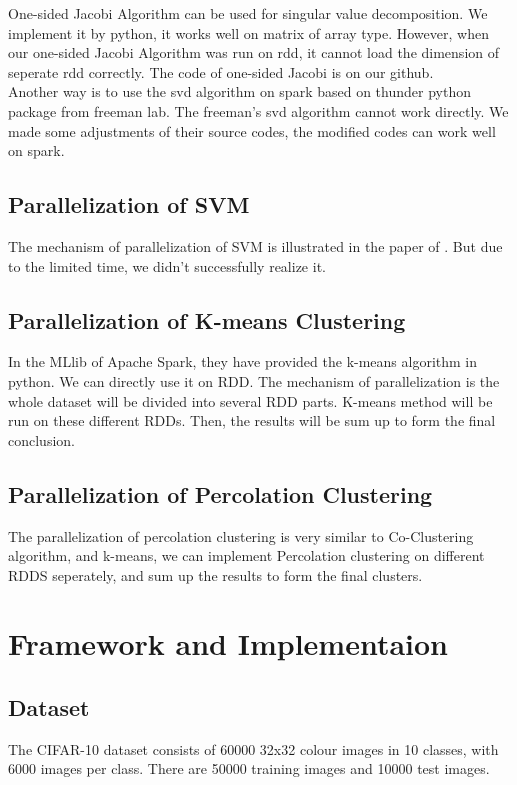 \documentclass[a4paper]{article}
\begin{document}
One-sided Jacobi Algorithm can be used for singular value decomposition\cite{Jacobi}. We implement it by python, it works well on matrix of array type. However, when our one-sided Jacobi Algorithm was run on rdd, it cannot load the dimension of seperate rdd correctly. The code of one-sided Jacobi is on our github. \\

Another way is to use the svd algorithm on spark based on thunder python package from freeman lab. The freeman's svd algorithm cannot work directly. We made some adjustments of their source codes, the modified codes can work well on spark.  


\subsection{Parallelization of SVM}

The mechanism of parallelization of SVM is illustrated in the paper of \cite{}. But due to the limited time, we didn't successfully realize it.

\subsection{Parallelization of K-means Clustering}

In the MLlib of Apache Spark, they have provided the k-means algorithm in python. We can directly use it on RDD. The mechanism of parallelization is the whole dataset will be divided into several RDD parts. K-means method will be run on these different RDDs. Then, the results will be sum up to form the final conclusion.

\subsection{Parallelization of Percolation Clustering}

The parallelization of percolation clustering is very similar to Co-Clustering algorithm, and k-means, we can implement Percolation clustering on different RDDS seperately, and sum up the results to form the final clusters. 

\section{Framework and Implementaion}

\subsection{Dataset}
The CIFAR-10 dataset consists of 60000 32x32 colour images in 10 classes, with 6000 images per class. There are 50000 training images and 10000 test images.
\end{document}
